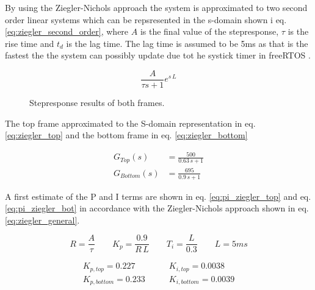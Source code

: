 \documentclass[../../../main]{subfiles}
\begin{document}
By using the Ziegler-Nichols approach the system is approximated to two second order linear systems
which can be repsresented in the s-domain shown i eq. \eqref{eq:ziegler_second_order}, where $A$ is
the final value of the stepresponse, $\tau$ is the rise time and $t_d$ is the lag time.
The lag time is assumed to be 5\si{ms} as that is the fastest the the system can possibly update due tot he systick timer in freeRTOS .

\begin{equation}
	\label{eq:ziegler_second_order}
	\frac{A}{\tau s+1}e^{s\,L}
\end{equation}

\begin{figure}[H]
        \centering
				\def\svgwidth{0.47\columnwidth}
				\def\svgwidth{0.47\columnwidth}
				\caption{Stepresponse results of both frames.}
				\label{fig:ziegler_step}
\end{figure}

The top frame approximated to the S-domain representation in eq. \eqref{eq:ziegler_top} and the bottom frame in eq. \eqref{eq:ziegler_bottom}

\begin{align}
	G_{Top}(s) &=\frac{500}{0.63\,s +1}
	\label{eq:ziegler_top}\\
	G_{Bottom}(s) &=\frac{695}{0.9\,s +1}
	\label{eq:ziegler_bottom}
\end{align}

A first estimate of the P and I terms are shown in eq. \eqref{eq:pi_ziegler_top} and eq. \eqref{eq:pi_ziegler_bot} in accordance with the Ziegler-Nichols approach shown in eq. \eqref{eq:ziegler_general}.

\begin{equation}
	\label{eq:ziegler_general}
	R = \frac{A}{\tau} \qquad K_p = \frac{0.9}{R\,L}\qquad T_i=\frac{L}{0.3} \qquad L = 5\si{ms}
\end{equation}

\begin{align}
	\label{eq:pi_ziegler_top}
	K_{p,top} = 0.227 \qquad &K_{i,top} = 0.0038\\
	\label{eq:pi_ziegler_bot}
	K_{p,bottom} = 0.233 \qquad &K_{i,bottom} = 0.0039
\end{align}
\end{document}
